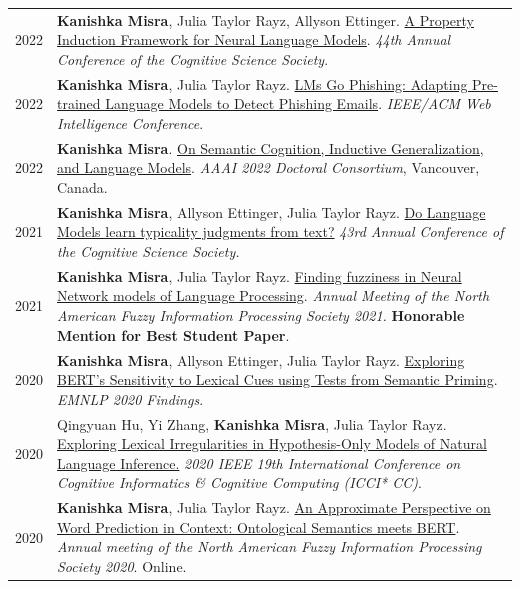 \documentclass[11pt]{article}
\begin{document}
\begin{longtable}{p{}  p{} }
2022 & \textbf{Kanishka Misra}, Julia Taylor Rayz, Allyson Ettinger. \href{https://escholarship.org/uc/item/6170h6nj}{A Property Induction Framework for Neural Language Models}. \textit{44th Annual Conference of the Cognitive Science Society}.\\

2022 & \textbf{Kanishka Misra}, Julia Taylor Rayz. \href{https://ieeexplore.ieee.org/document/10101955}{LMs Go Phishing: Adapting Pre-trained Language Models to Detect Phishing Emails}. \textit{IEEE/ACM Web Intelligence Conference}.\\

2022 & \textbf{Kanishka Misra}. \href{https://ojs.aaai.org/index.php/AAAI/article/view/21584}{On Semantic Cognition, Inductive Generalization, and Language Models}. \textit{AAAI 2022 Doctoral Consortium}, Vancouver, Canada.\\

2021 & \textbf{Kanishka Misra}, Allyson Ettinger, Julia Taylor Rayz. \href{https://escholarship.org/uc/item/9n77r9mr#main}{Do Language Models learn typicality judgments from text?} \textit{43rd Annual Conference of the Cognitive Science Society.}\\

2021 & \textbf{Kanishka Misra}, Julia Taylor Rayz. \href{http://kanishka.website/papers/nafips21.pdf}{Finding fuzziness in Neural Network models of Language Processing}. \textit{Annual Meeting of the North American Fuzzy Information Processing Society 2021.} \textcolor{award}{\textbf{Honorable Mention for Best Student Paper}}.\\

2020 & \textbf{Kanishka Misra}, Allyson Ettinger, Julia Taylor Rayz. \href{http://dx.doi.org/10.18653/v1/2020.findings-emnlp.415}{Exploring BERT's Sensitivity to Lexical Cues using Tests from Semantic Priming}. \textit{EMNLP 2020 Findings}.\\

2020 & Qingyuan Hu, Yi Zhang, \textbf{Kanishka Misra}, Julia Taylor Rayz. \href{https://arxiv.org/abs/2101.07397}{Exploring Lexical Irregularities in Hypothesis-Only Models of Natural Language Inference.}  \textit{2020 IEEE 19th International Conference on Cognitive Informatics \& Cognitive Computing (ICCI* CC)}.\\

2020 & \textbf{Kanishka Misra}, Julia Taylor Rayz. \href{https://kanishka.website/papers/nafips.pdf}{An Approximate Perspective on Word Prediction in Context: Ontological Semantics meets BERT}. \textit{Annual meeting of the North American Fuzzy Information Processing Society 2020}. Online.\\


\end{longtable}
\end{document}
